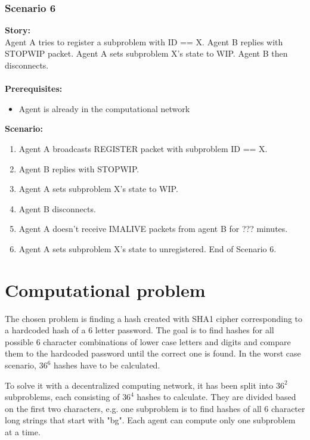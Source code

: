 \documentclass{article}
\begin{document}
\subsubsection{Scenario 6}
\noindent\textbf{Story:} \\
Agent A tries to register a subproblem with ID == X. Agent B replies with STOPWIP packet. Agent A sets subproblem X's state to WIP. Agent B then disconnects. \\\\
\textbf{Prerequisites:}
\begin{itemize}
    \item Agent is already in the computational network
\end{itemize}
\textbf{Scenario:}
\begin{enumerate}
    \item Agent A broadcasts REGISTER packet with subproblem ID == X.
    \item Agent B replies with STOPWIP.
    \item Agent A sets subproblem X's state to WIP.
    \item Agent B disconnects.
    \item Agent A doesn't receive IMALIVE packets from agent B for ??? minutes.
    \item Agent A sets subproblem X's state to unregistered. End of Scenario 6.
\end{enumerate}

\section{Computational problem}
The chosen problem is finding a hash created with SHA1 cipher corresponding to a hardcoded hash of a 6 letter password.
The goal is to find hashes for all possible 6 character combinations of lower case letters and digits and compare them to the hardcoded password until the correct one is found.
In the worst case scenario, $36^6$ hashes have to be calculated.

To solve it with a decentralized computing network, it has been split into $36^2$ subproblems,
each consisting of $36^4$ hashes to calculate. They are divided based on the first two characters,
e.g. one subproblem is to find hashes of all 6 character long strings that start with "bg".
Each agent can compute only one subproblem at a time.
\end{document}
